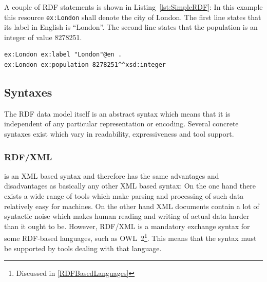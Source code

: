 A couple of RDF statements is shown in Listing~\ref{lst:SimpleRDF}:
In this example this resource \texttt{ex:London} shall denote the city of
London. The first line states that its label in English is ``London''.
The second line states that the population is an integer of value {8278251}.


\begin{listing}[H]
\caption{Examples of RDF statements}
\label{lst:SimpleRDF}
\begin{verbatim}
ex:London ex:label "London"@en .
ex:London ex:population 8278251^^xsd:integer
\end{verbatim}
\end{listing}



\subsection{Syntaxes}
The RDF data model itself is an abstract syntax which means that it is
independent of any particular representation or encoding.
Several concrete syntaxes exist which vary in readability, expressiveness and
tool support.

\subsubsection{RDF/XML} is an XML based syntax and therefore has the same
advantages and disadvantages as basically any other XML based syntax: On the one hand there
exists a wide range of tools which make parsing and processing of such data
relatively easy for machines. On the other hand XML documents contain a lot of
syntactic noise which makes human reading and writing of actual data
harder than it ought to be. However, RDF/XML is a
mandatory exchange syntax\cite{OWL2DocumentOverview} for some RDF-based
languages, such as
\mbox{OWL 2}\footnote{Discussed in \ref{RDFBasedLanguages}}.
This means that the syntax must be supported by tools dealing with that
language.


